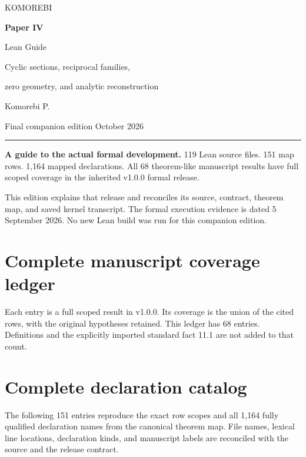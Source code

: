

\begin{titlepage}
\vspace*{17mm}
{\sffamily\color{teal}\Large KOMOREBI\par}
\vspace{10mm}
{\Huge\bfseries Paper IV\par}
\vspace{5mm}
{\LARGE\sffamily Lean Guide\par}
\vspace{7mm}
{\Large Cyclic sections, reciprocal families,\par zero geometry, and analytic reconstruction\par}
\vspace{12mm}
{\large Komorebi P.\par}
\vspace{2mm}
{Final companion edition October 2026\par}
\vfill
\par\noindent\begingroup\color{teal}\rule{\textwidth}{1pt}\endgroup\par
\textbf{A guide to the actual formal development.}
119 Lean source files. 151 map rows. 1,164 mapped declarations.
All 68 theorem-like manuscript results have full scoped coverage in the inherited v1.0.0 formal release.

This edition explains that release and reconciles its source, contract, theorem map, and saved kernel transcript. The formal execution evidence is dated 5 September 2026. No new Lean build was run for this companion edition.
\end{titlepage}
\begingroup\small
\tableofcontents
\endgroup
\clearpage

\clearpage
\clearpage
\clearpage
\clearpage
\clearpage
\clearpage
\clearpage
\clearpage
\section{Complete manuscript coverage ledger}
\label{sec:ledger}
Each entry is a full scoped result in v1.0.0. Its coverage is the union of the cited rows, with the original hypotheses retained. This ledger has 68 entries. Definitions and the explicitly imported standard fact 11.1 are not added to that count.

\clearpage
\section{Complete declaration catalog}
\label{sec:catalog}
The following 151 entries reproduce the exact row scopes and all 1,164 fully qualified declaration names from the canonical theorem map. File names, lexical line locations, declaration kinds, and manuscript labels are reconciled with the source and the release contract.

